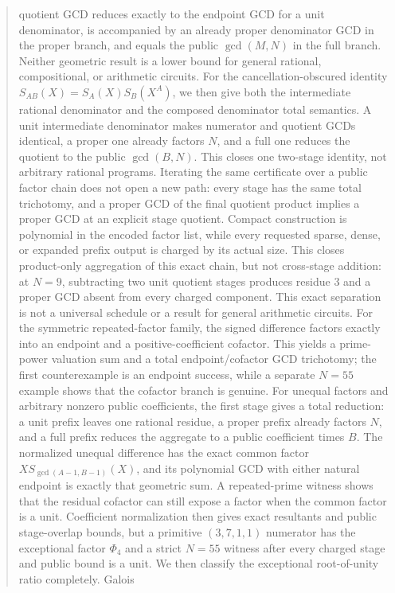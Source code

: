\documentclass[11pt]{article}
\begin{document}
\begin{abstract}
quotient GCD reduces exactly to the endpoint GCD for a unit denominator, is
accompanied by an already proper denominator GCD in the proper branch, and
equals the public \(\gcd(M,N)\) in the full branch. Neither geometric result
is a lower bound for general rational, compositional, or arithmetic circuits.
For the cancellation-obscured identity
\(S_{AB}(X)=S_A(X)S_B(X^A)\), we then give both the intermediate rational
denominator and the composed denominator total semantics. A unit intermediate
denominator makes numerator and quotient GCDs identical, a proper one already
factors \(N\), and a full one reduces the quotient to the public
\(\gcd(B,N)\). This closes one two-stage identity, not arbitrary rational
programs. Iterating the same certificate over a public factor chain does not
open a new path: every stage has the same total trichotomy, and a proper GCD
of the final quotient product implies a proper GCD at an explicit stage
quotient. Compact construction is polynomial in the encoded factor list,
while every requested sparse, dense, or expanded prefix output is charged by
its actual size. This closes product-only aggregation of this exact chain,
but not cross-stage addition: at \(N=9\), subtracting two unit quotient
stages produces residue \(3\) and a proper GCD absent from every charged
component. This exact separation is not a universal schedule or a result for
general arithmetic circuits. For the symmetric repeated-factor family, the
signed difference factors exactly into an endpoint and a positive-coefficient
cofactor. This yields a prime-power valuation sum and a total endpoint/cofactor
GCD trichotomy; the first counterexample is an endpoint success, while a
separate \(N=55\) example shows that the cofactor branch is genuine.
For unequal factors and arbitrary nonzero public coefficients, the first
stage gives a total reduction: a unit prefix leaves one rational residue, a
proper prefix already factors \(N\), and a full prefix reduces the aggregate
to a public coefficient times \(B\). The normalized unequal difference has
the exact common factor \(XS_{\gcd(A-1,B-1)}(X)\), and its polynomial GCD
with either natural endpoint is exactly that geometric sum. A repeated-prime
witness shows that the residual cofactor can still expose a factor when the
common factor is a unit. Coefficient normalization then gives exact
resultants and public stage-overlap bounds, but a primitive
\((3,7,1,1)\) numerator has the exceptional factor \(\Phi_4\) and a strict
\(N=55\) witness after every charged stage and public bound is a unit.
We then classify the exceptional root-of-unity ratio completely. Galois

\end{abstract}
\end{document}
